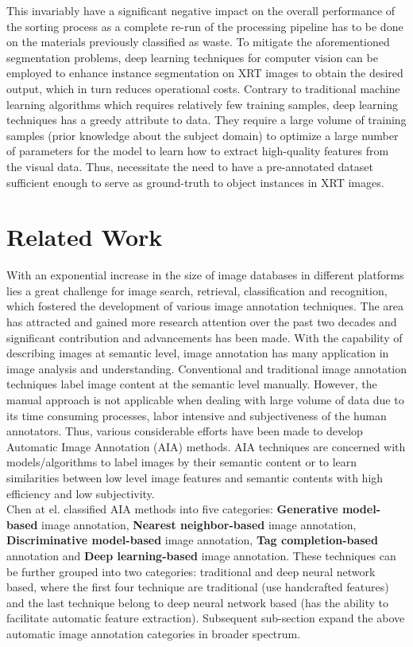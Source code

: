 \documentclass[conference]{IEEEtran}
\begin{document}
	This invariably have a significant
negative impact on the overall performance of the sorting process as a complete re-run of
the processing pipeline has to be done on the materials previously classified as waste. To
mitigate the aforementioned segmentation problems, deep learning techniques for computer vision can be employed to enhance instance segmentation on XRT images to obtain the
desired output, which in turn reduces operational costs. Contrary to traditional machine
learning algorithms which requires relatively few training samples, deep learning techniques
has a greedy attribute to data. They require a large volume of training samples
(prior knowledge about the subject domain) to optimize a large number of parameters for the
model to learn how to extract high-quality features from the visual data. Thus, necessitate
the need to have a pre-annotated dataset sufficient enough to serve as ground-truth to
object instances in XRT images.\\

\section{Related Work}

 	With an exponential increase
in the size of image databases in different platforms lies a great challenge for image search,
retrieval, classification and recognition, which fostered the development of various image annotation techniques. The area has attracted and gained more research attention
over the past two decades and significant contribution and advancements has been made.
With the capability of describing images at semantic level, image annotation has many application in image analysis and understanding. Conventional and traditional image
annotation techniques label image content at the semantic level manually. However, the
manual approach is not applicable when dealing with large volume of data due to its time
consuming processes, labor intensive and subjectiveness of the human annotators. Thus,
various considerable efforts have been made to develop Automatic Image Annotation (AIA)
methods. AIA techniques are concerned with models/algorithms to label images by their
semantic content or to learn similarities between low level image features and semantic
contents with high efficiency and low subjectivity.\\
 	
 	Chen at el. \cite{b2} classified AIA methods into five categories: \textbf{Generative model-based} image annotation, \textbf{Nearest neighbor-based}
image annotation, \textbf{Discriminative model-based} image annotation, \textbf{Tag completion-based}
annotation and \textbf{Deep learning-based} image annotation. These techniques can be further
grouped into two categories: traditional and deep neural network based, where the first
four technique are traditional (use handcrafted features) and the last technique belong to
deep neural network based (has the ability to facilitate automatic feature extraction). Subsequent sub-section expand the above automatic
image annotation categories in broader spectrum.
\end{document}
